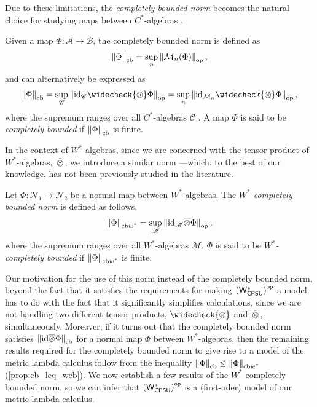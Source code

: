 Due to these limitations, the \emph{completely bounded norm} becomes the natural choice for studying maps between $C^*$-algebras \cite{effrosOperatorSpaces2000,paulsenCompletelyBoundedMaps2003}. 

\begin{definition} \label{def:cb_norm}
Given a map \( \Phi \colon \mathscr{A} \to \mathscr{B} \), the completely bounded norm is defined as
\[
\left\lVert \Phi \right\rVert_{\text{cb}} = \sup_n \left\lVert \mathcal{M}_{n}(\Phi) \right\rVert_{\text{op}},
\]
and can alternatively be expressed as
\[
\cbnorm{\Phi} = \sup_{\mathscr{C}} \opnorm{\id_{\mathscr{C}} \widecheck{\otimes} \Phi } = \sup_{n} \opnorm{\id_{\SqMatrix{n}} \widecheck{\otimes} \Phi },
\]
where the supremum ranges over all $C^*$-algebras \( \mathscr{C} \) \cite[Introduction, p.~4]{pisierTensorProductsCAlgebras2020}. A map $\Phi$ is said to be \emph{completely bounded} if $\left\lVert \Phi \right\rVert_{\text{cb}}$ is finite.
\end{definition} 

In the context of $W^*$-algebras, since we are concerned with the tensor product of $W^*$-algebras, $\overline{\otimes}$, we introduce a similar norm
---which, to the best of our knowledge, has not been previously studied in the literature.
\begin{definition} \label{def:wcb_nor}
  Let $\Phi:\mathscr{N}_1 \to \mathscr{N}_2$ be a normal map between $W^*$-algebras. The \emph{$W^*$ completely bounded norm} is defined as follows,
  \[ \left\lVert \Phi \right\rVert_{\text{cb$w^*$}} = \sup_{\mathscr{M}} \left\lVert \mathrm{id}_{\mathscr{M}} \overline{\otimes} \Phi \right\rVert_{\text{op}}, \]
where the supremum ranges over all $W^*$-algebras \( \mathscr{M} \). $\Phi$ is said to be \emph{$W^*$-completely bounded} if $\left\lVert \Phi \right\rVert_{\text{cb$w^*$}}$ is finite.
\end{definition}


Our motivation for the use of this norm instead of the completely bounded norm, beyond the fact that it satisfies the requirements for making \( \left(\mathsf{W^*_{CPSU}}\right)^{\mathsf{op}} \) a model, has to do with the fact that it significantly simplifies calculations, since we are not handling two different tensor products, \( \widecheck{\otimes} \) and \( \overline{\otimes} \), simultaneously. Moreover, if it turns out that the completely bounded norm satisfies \( \left\lVert \mathrm{id} \overline{\otimes} \Phi \right\rVert_{\text{cb}} \) for a normal map \( \Phi \) between \( W^* \)-algebras, then the remaining results required for the completely bounded norm to give rise to a model of the metric lambda calculus follow from the inequality
$
\left\lVert \Phi \right\rVert_{\text{cb}} \leq \left\lVert \Phi \right\rVert_{\text{cb$w^*$}}
$
(\autoref{prop:cb_leq_wcb}). We now establish a few results of the $W^*$ completely bounded norm, so we can infer that $\left(\mathsf{W^*_{CPSU}}\right)^{\mathsf{op}}$ is a (first-oder) model of our metric lambda calculus.


